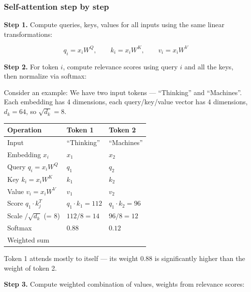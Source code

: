 \documentclass[10pt]{article}
\begin{document}
\subsubsection{Self-attention step by step}

\textbf{Step 1.} Compute queries, keys, values for all inputs
using the same linear transformations:

\begin{equation*}
q_{i} = x_{i} W^{Q}, \qquad k_{i} = x_{i} W^{K}, \qquad v_{i} = x_{i} W^{V}
\end{equation*}

\textbf{Step 2.} For token $i$, compute relevance scores using
query $i$ and all the keys, then normalize via softmax:

Consider an example: We have two input tokens ---
``Thinking'' and ``Machines''. Each embedding has 4 dimensions,
each query/key/value vector has 4 dimensions, $d_k = 64$, so $\sqrt{d_k} = 8$.

\begin{center}
\renewcommand{\arraystretch}{1.1}
\begin{tabular}{|p{4.5cm}|>{\centering\arraybackslash}p{4.5cm}|>{\centering\arraybackslash}p{4.5cm}|}
\hline
\rule{0pt}{10pt}\textbf{Operation} & \textbf{Token 1} & \textbf{Token 2} \\
\hline
\rule{0pt}{8pt}Input & ``Thinking'' & ``Machines'' \\
\hline
Embedding $x_i$ & $x_1$ & $x_2$ \\
\hline
Query $q_i = x_i W^Q$ & $q_1$ & $q_2$ \\
\hline
Key $k_i = x_i W^K$ & $k_1$ & $k_2$ \\
\hline
Value $v_i = x_i W^V$ & $v_1$ & $v_2$ \\
\hline
Score $q_1 \cdot k_j^T$ & $q_1 \cdot k_1 = 112$ & $q_1 \cdot k_2 = 96$ \\
\hline
Scale $/ \sqrt{d_k}$ (= 8) & $112 / 8 = 14$ & $96 / 8 = 12$ \\
\hline
Softmax & $0.88$ & $0.12$ \\
\hline
Weighted sum & \multicolumn{2}{c|}{$z_1 = 0.88 \cdot v_1 + 0.12 \cdot v_2$} \\
\hline
\end{tabular}
\end{center}

Token 1 attends mostly to itself --- its weight 0.88 is significantly
higher than the weight of token 2.

\textbf{Step 3.} Compute weighted combination of values,
weights from relevance scores:
\end{document}
